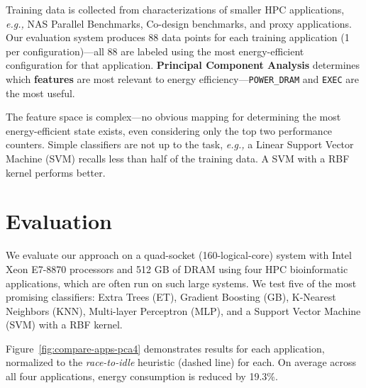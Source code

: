 \documentclass[a0,portrait]{a0poster}
\newcommand{\eg}{\textit{e.g., }}
\newcommand{\figref}[1]{Figure~\ref{fig:#1}}
\newcommand{\pc}[1]{\mbox{\texttt{#1}}}
\newcommand{\PAD}{\vskip 0.75cm}
\begin{document}
\begin{multicols}{2}
Training data is collected from characterizations of smaller HPC applications, \eg NAS Parallel Benchmarks, Co-design benchmarks, and proxy applications.
Our evaluation system produces 88 data points for each training application (1 per configuration)---all 88 are labeled using the most energy-efficient configuration for that application.
\textbf{Principal Component Analysis} determines which \textbf{features} are most relevant to energy efficiency---\pc{POWER\_DRAM} and \pc{EXEC} are the most useful.

The feature space is complex---no obvious mapping for determining the most energy-efficient state exists, even considering only the top two performance counters.
Simple classifiers are not up to the task, \eg a Linear Support Vector Machine (SVM) recalls less than half of the training data.
A SVM with a RBF kernel performs better.


\section*{Evaluation}

We evaluate our approach on a quad-socket (160-logical-core) system with Intel Xeon E7-8870 processors and 512 GB of DRAM using four HPC bioinformatic applications, which are often run on such large systems.
We test five of the most promising classifiers: Extra Trees (ET), Gradient Boosting (GB), K-Nearest Neighbors (KNN), Multi-layer Perceptron (MLP), and a Support Vector Machine (SVM) with a RBF kernel.

{
\PAD
\PAD
\centering
  
  \label{fig:compare-apps-pca4}
\PAD
}

\figref{compare-apps-pca4} demonstrates results for each application, normalized to the \emph{race-to-idle} heuristic (dashed line) for each.
On average across all four applications, energy consumption is reduced by 19.3\%.

{
\PAD
\PAD
\centering
  
  \label{fig:ts-hipmer-dvfs}
\PAD
}

{
\PAD
\centering
  
  \label{fig:ts-hipmer-all-et}
\PAD
}


\end{multicols}
\end{document}
